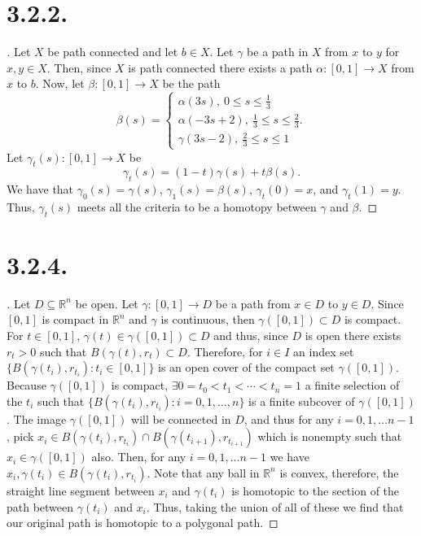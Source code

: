 \documentclass{article}
\begin{document}
\section*{3.2.2.}
\begin{proof}[\unskip\nopunct]
   Let $X$ be path connected and let $b \in X$. Let $\gamma$ be a path in $X$ from $x$ to $y$ for $x, y \in X$. Then, since $X$ is path connected there exists a path $\alpha:[0, 1] \to X$ from $x$ to $b$. Now, let $\beta:[0, 1] \to X$ be the path 
   \[
    \beta(s) = \begin{cases}
        \alpha(3s), \ 0 \leq s \leq \frac{1}{3} \\
        \alpha(-3s +2), \ \frac{1}{3} \leq s \leq \frac{2}{3}. \\
        \gamma(3s - 2), \ \frac{2}{3} \leq s\leq  1
    \end{cases}
    \]
    Let $\gamma_t(s):[0, 1] \to X$ be 
    \[
    \gamma_t(s) = (1 - t) \gamma(s) + t \beta(s).   
    \]
    We have that $\gamma_0(s) = \gamma(s)$, $\gamma_1(s) = \beta(s)$, $\gamma_t(0) = x$, and $\gamma_t(1) = y$. 
    Thus, $\gamma_t(s)$ meets all the criteria to be a homotopy between $\gamma$ and $\beta$. 
\end{proof}

\section*{3.2.4.}
\begin{proof}[\unskip\nopunct]
    Let $D \subseteq \mathbb{R}^n$ be open. 
    Let $\gamma:[0, 1] \to D$ be a path from $x \in D$ to $y \in D$. 
    Since $[0, 1]$ is compact in $\mathbb{R}^n$ and $\gamma$ is continuous, then $\gamma([0, 1]) \subset D$ is compact. 
    For $t \in [0, 1]$, $\gamma(t) \in \gamma([0, 1]) \subset D$ and thus, since $D$ is open there exists $r_t > 0$ such that $B(\gamma(t), r_t) \subset D$. Therefore, for $i \in I$ an index set $\{B(\gamma(t_i), r_{t_{i}}) : t_i \in [0, 1] \}$ is an open cover of the compact set $\gamma([0, 1])$. 
    Because $\gamma([0, 1])$ is compact, $\exists 0 = t_0 < t_1 < \cdots < t_n = 1$ a finite selection of the $t_i$ such that $\{B(\gamma(t_i), r_{t_{i}}) : i = 0, 1, \ldots , n \}$ is a finite subcover of $\gamma([0, 1])$. 
    The image $\gamma([0, 1])$ will be connected in $D$, and thus for any $i = 0, 1, \ldots n - 1$, pick $x_i \in B(\gamma(t_i), r_{t_{i}}) \cap B(\gamma(t_{i + 1}), r_{t_{i + 1}})$ which is nonempty such that $x_i \in \gamma([0, 1])$ also. 
    Then, for any $i = 0, 1, \ldots n - 1$ we have $x_i, \gamma(t_i) \in B(\gamma(t_i), r_{t_{i}})$. Note that any ball in $\mathbb{R}^n$ is convex, therefore, the straight line segment between $x_i$ and $\gamma(t_i)$ is homotopic to the section of the path between $\gamma(t_i)$ and $x_i$. Thus, taking the union of all of these 
    we find that our original path is homotopic to a polygonal path. 


\end{proof}
\end{document}
